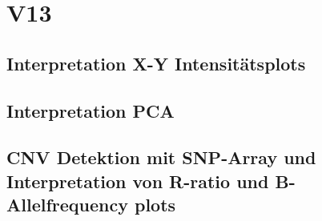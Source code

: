 \section{V13}
\subsection{Interpretation X-Y Intensitätsplots}

\subsection{Interpretation PCA}

\subsection{CNV Detektion mit SNP-Array und Interpretation von R-ratio und B-Allelfrequency plots}